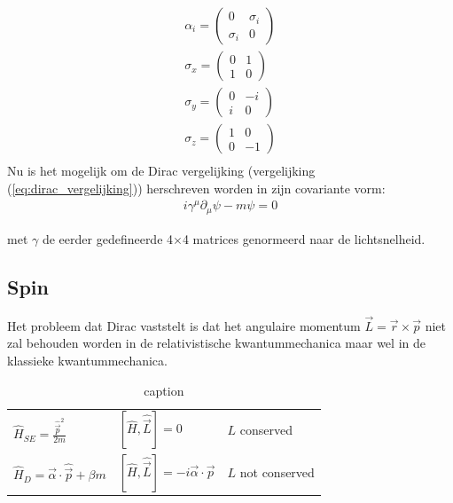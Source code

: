 \documentclass[../main.tex]{subfiles}
\begin{document}
\begin{equation}
    \begin{aligned}
        \label{eq:dirac_alpha}
        \alpha_i=
        \begin{pmatrix}
            0 & \sigma_i\\
            \sigma_i & 0
        \end{pmatrix}\\
        \sigma_x=
        \begin{pmatrix}
            0 & 1\\
            1 & 0
        \end{pmatrix}\\
        \sigma_y=
        \begin{pmatrix}
            0 & -i\\
            i & 0
        \end{pmatrix}\\
        \sigma_z=
        \begin{pmatrix}
            1 & 0\\
            0 & -1
        \end{pmatrix}\\
    \end{aligned}
\end{equation}
Nu is het mogelijk om de Dirac vergelijking (vergelijking (\ref{eq:dirac_vergelijking})) herschreven worden in zijn covariante vorm:
\begin{equation}
    \begin{aligned}
        \label{eq:dirac_covariant}
        i\gamma^\mu\partial_\mu\psi - m\psi =0
    \end{aligned}
\end{equation}

met $\gamma$ de eerder gedefineerde 4$\times$4 matrices genormeerd naar de lichtsnelheid.

\subsection{Spin}%
\label{sub:spin}

Het probleem dat Dirac vaststelt is dat het angulaire momentum $\vec{L}=\vec{r}\times\vec{p}$ niet zal behouden worden in de relativistische kwantummechanica maar wel in de klassieke kwantummechanica.

\begin{table}[h]
    \centering
    \caption{caption}
    \label{tab:rel_vs_klas_kwan}
    \begin{tabular}{l|l|l}
        $\hat{H}_{SE} = \frac{\hat{\vec{p}}^2}{2m}$             & $[\hat{H},\hat{\vec{L}}]=0$                           & $L$ conserved \\
        $\hat{H}_D = \vec{\alpha}\cdot \hat{\vec{p}}+\beta m$   & $[\hat{H},\hat{\vec{L}}]=-i\vec{\alpha}\cdot \vec{p}$ & $L$ not conserved
    \end{tabular}
\end{table}
\end{document}
